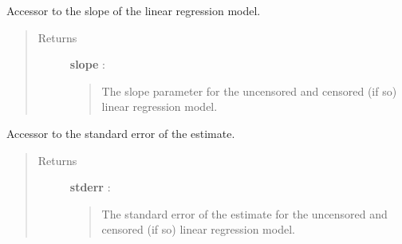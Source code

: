\documentclass[letterpaper,10pt,english]{sphinxmanual}
\begin{document}
\begin{fulllineitems}
\begin{fulllineitems}
\begin{quote}
\begin{description}
\end{description}\end{quote}

\end{fulllineitems}


\begin{fulllineitems}
\label{_generated/otpod.UnivariateLinearModelAnalysis:otpod.UnivariateLinearModelAnalysis.getSlope}
Accessor to the slope of the linear regression model.
\begin{quote}\begin{description}
\item[{Returns}] \leavevmode
\textbf{slope} : \href{http://doc.openturns.org/openturns-latest/sphinx/user\_manual/\_generated/openturns.NumericalPoint.html\#openturns.NumericalPoint}{}
\begin{quote}

The slope parameter for the uncensored and censored (if so) linear
regression model.
\end{quote}

\end{description}\end{quote}

\end{fulllineitems}


\begin{fulllineitems}
\label{_generated/otpod.UnivariateLinearModelAnalysis:otpod.UnivariateLinearModelAnalysis.getStandardError}
Accessor to the standard error of the estimate.
\begin{quote}\begin{description}
\item[{Returns}] \leavevmode
\textbf{stderr} : \href{http://doc.openturns.org/openturns-latest/sphinx/user\_manual/\_generated/openturns.NumericalPoint.html\#openturns.NumericalPoint}{}
\begin{quote}

The standard error of the estimate for the uncensored and censored
(if so) linear regression model.
\end{quote}

\end{description}\end{quote}


\end{fulllineitems}
\end{fulllineitems}
\end{document}
